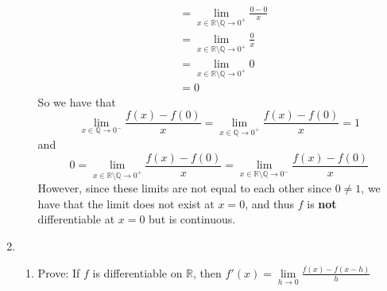 \documentclass[12pt,letterpaper]{article}
\newcommand{\R}{\mathbb{R}}
\newcommand{\Q}{\mathbb{Q}}
\theoremstyle{case}
\theoremstyle{definition}
\begin{document}
\begin{enumerate}
\begin{enumerate}
\begin{align*}
				&= \lim\limits_{x \in \R \setminus \Q \to 0^+} \frac{0-0}{x} \\
				&= \lim\limits_{x \in \R \setminus \Q \to 0^+} \frac{0}{x} \\
				&= \lim\limits_{x \in \R \setminus \Q \to 0^+} 0 \\
				&= 0
			\end{align*}
			So we have that
			\[\lim\limits_{x \in \Q \to 0^-} \frac{f(x)-f(0)}{x}=\lim\limits_{x \in \Q \to 0^+} \frac{f(x)-f(0)}{x}=1\] 
			and 
			\[0 = \lim\limits_{x \in \R \setminus \Q \to 0^+} \frac{f(x)-f(0)}{x} = \lim\limits_{x \in \R \setminus \Q \to 0^-} \frac{f(x)-f(0)}{x}\]
			However, since these limits are not equal to each other since $0 \neq 1$, we have that the limit does not exist at $x=0$, and thus $f$ is \textbf{not} differentiable at $x=0$ but is continuous.\\
		\end{enumerate}
		\item 
		\begin{enumerate}
			\item Prove: If $f$ is differentiable on $\R$, then $f'(x)=\lim\limits_{h \to 0} \frac{f(x)-f(x-h)}{h}$\\
			

\end{enumerate}
\end{enumerate}
\end{document}
